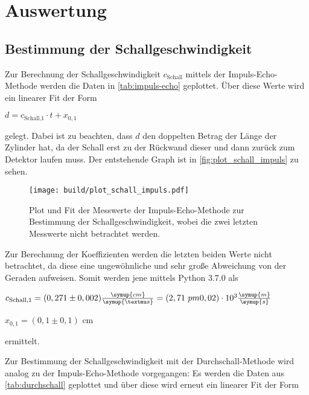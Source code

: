 \section{Auswertung}
\label{sec:Auswertung}
\subsection{Bestimmung der Schallgeschwindigkeit}

Zur Berechnung der Schallgeschwindigkeit $c_\text{Schall}$ mittels der Impuls-Echo-Methode werden die Daten in \autoref{tab:impuls-echo} geplottet.
Über diese Werte wird ein linearer Fit der Form

\begin{center}
    $d = c_\text{Schall,1} \cdot t + x_{0,1}$
\end{center}

gelegt. Dabei ist zu beachten, dass $d$ den doppelten Betrag der Länge der Zylinder hat, da der Schall erst zu der Rückwand dieser und dann zurück zum Detektor laufen muss.
Der entstehende Graph ist in \autoref{fig:plot_schall_impuls} zu sehen.



\begin{figure}
    \centering
    \texttt{[image: build/plot\_schall\_impuls.pdf]}
    \caption{Plot und Fit der Messwerte der Impuls-Echo-Methode zur Bestimmung der Schallgeschwindigkeit, wobei die zwei letzten Messwerte nicht betrachtet werden.}
    \label{fig:plot_schall_impuls}
\end{figure}

Zur Berechnung der Koeffizienten werden die letzten beiden Werte nicht betrachtet, da diese eine ungewöhnliche und sehr große Abweichung von der Geraden aufweisen.
Somit werden jene mittels Python 3.7.0 als

\begin{center}
    $c_\text{Schall,1} = (0,271 \pm 0,002) \frac{\symup{cm}}{\symup{µs}} = (2,71 \ pm 0,02) \cdot 10^{3} \frac{\symup{m}}{\symup{s}}$
    
    $x_{0,1} = (0,1 \pm 0,1)$ cm
\end{center}

ermittelt.




Zur Bestimmung der Schallgeschwindigkeit mit der Durchschall-Methode wird analog zu der Impuls-Echo-Methode vorgegangen:
Es werden die Daten aus \autoref{tab:durchschall} geplottet und über diese wird erneut ein linearer Fit der Form

